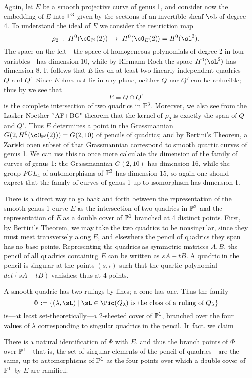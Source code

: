 Again, let $E$ be a smooth projective curve of genus 1, and consider now the embedding of $E$ into $\PP^3$ given by the sections of an invertible sheaf $\sL$ of degree 4. To understand the ideal of $E$ we consider the restriction map
$$
\rho_2 \;  : \; H^0(\cO_{\PP^3}(2)) \; \to \; H^0(\cO_{E}(2)) = H^0(\sL^2).
$$
The space on the left---the space of homogeneous polynomials of degree 2 in four variables---has dimension 10, while by Riemann-Roch the space $H^0(\sL^2)$ has dimension 8. It follows that $E$ lies on at least two linearly independent quadrics $Q$ and $Q'$. Since $E$ does not lie in any plane, neither $Q$ nor $Q'$ can be reducible; thus by \bt we see that
$$
E = Q \cap Q'
$$
is the complete intersection of two quadrics in $\PP^3$. Moreover, we also see from the Lasker-Noether ``AF+BG" theorem that the kernel of $\rho_2$ is exactly the span of $Q$ and $Q'$. Thus $E$ determines a point in the Grassmannian $G(2, H^0(\cO_{\PP^3}(2))) = G(2, 10)$ of pencils of quadrics; and by Bertini's Theorem, a Zariski open subset of that Grassmannian correspond to smooth quartic curves of genus 1. We can use this to once more calculate the dimension of the family of curves of genus 1: the Grassmannian $G(2,10)$ has dimension 16, while the group $PGL_4$ of automorphisms of $\PP^3$ has dimension 15, so again one should expect that the family of curves of genus 1 up to isomorphism has dimension 1.

There is a direct way to go back and forth between the representation of the smooth genus 1 curve $E$ as the intersection of two quadrics in $\PP^3$ and the representation of $E$ as a double cover
of $\PP^1$ branched at 4 distinct points. First, by Bertini's Theorem, we may take the two quadrics to be nonsingular, since they must meet transversely along $E$, and elsewhere the
pencil of quadrics they span has no base points. Representing the quadrics as symmetric matrices $A,B$, the pencil of all quadrics containing $E$ can be 
written as $sA+tB$. A quadric in the pencil is singular at the points $(s,t)$ such that the quartic polynomial $det(sA+tB)$ vanishes; thus at 4 points.

 A smooth quadric has two rulings by lines; a cone has one. Thus the family
$$
\Phi := \{ (\lambda, \sL) \mid \sL \in \Pic(Q_\lambda) \text{ is the class of a ruling of } Q_\lambda \}
$$
is---at least set-theoretically---a 2-sheeted cover of $\PP^1$, branched over the four values of $\lambda$ corresponding to singular quadrics in the pencil. In fact, we claim

\begin{proposition}\label{rulings on pencil}
There is a natural identification of $\Phi$ with $E$, and thus the branch points of $\Phi$ over $\PP^1$---that is, the set of singular elements of the pencil of quadrics---are the same, up to automorphisms of $\PP^1$ as the four points over which a double cover of $\PP^1$ by $E$ are ramified.
\end{proposition} 


